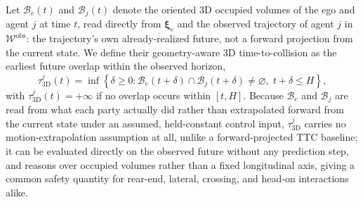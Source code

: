 \documentclass[letterpaper, 10 pt, conference]{ieeeconf}  %
\begin{document}
Let $\mathcal{B}_{e}(t)$ and $\mathcal{B}_{j}(t)$ denote the oriented 3D
occupied volumes of the ego and agent $j$ at time $t$, read directly from
$\bm{\xi}_e$ and the observed trajectory of agent $j$ in
$\mathcal{W}^{\mathrm{obs}}$: the trajectory's own already-realized
future, not a forward projection from the current state. We define their
geometry-aware 3D time-to-collision as the earliest future overlap within
the observed horizon,
\begin{equation}
\tau_{\mathrm{3D}}^{j}(t)
=
\inf\!\left\{
\delta\geq0:
\mathcal{B}_{e}(t+\delta)
\cap
\mathcal{B}_{j}(t+\delta)
\neq\varnothing,\;
t+\delta\le H
\right\},
\label{eq:high_level_3d_ttc}
\end{equation}
with $\tau_{\mathrm{3D}}^{j}(t)=+\infty$ if no overlap occurs within
$[t,H]$. Because $\mathcal{B}_e$ and $\mathcal{B}_j$ are read from what
each party actually did rather than extrapolated forward from the
current state under an assumed, held-constant control input,
$\tau_{\mathrm{3D}}^{j}$ carries no motion-extrapolation assumption at
all, unlike a forward-projected TTC baseline; it can be evaluated
directly on the observed future without any prediction step, and reasons
over occupied volumes rather than a fixed longitudinal axis, giving a
common safety quantity for rear-end, lateral, crossing, and head-on
interactions alike.
\end{document}
